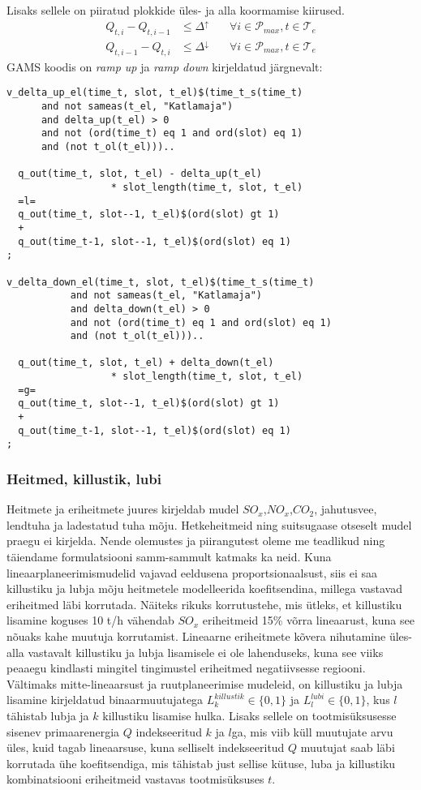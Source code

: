 \documentclass[10pt,a4paper]{article}
\begin{document}
Lisaks sellele on piiratud plokkide üles- ja alla koormamise kiirused.
\begin{align}
Q_{t,i} - Q_{t,i-1} &\leq \mathit{\Delta^{\uparrow}} \quad &\forall i \in \mathcal{P}_{max}, t \in \mathcal{T}_e\\
Q_{t,i-1} - Q_{t,i} &\leq \mathit{\Delta^{\downarrow}}\quad &\forall i \in \mathcal{P}_{max}, t \in \mathcal{T}_e
\end{align}
GAMS koodis on \emph{ramp up} ja \emph{ramp down} kirjeldatud järgnevalt:
\begin{verbatim}
v_delta_up_el(time_t, slot, t_el)$(time_t_s(time_t)
      and not sameas(t_el, "Katlamaja")
      and delta_up(t_el) > 0
      and not (ord(time_t) eq 1 and ord(slot) eq 1) 
      and (not t_ol(t_el)))..

  q_out(time_t, slot, t_el) - delta_up(t_el)
                  * slot_length(time_t, slot, t_el)
  =l=
  q_out(time_t, slot--1, t_el)$(ord(slot) gt 1)
  +
  q_out(time_t-1, slot--1, t_el)$(ord(slot) eq 1)
;

v_delta_down_el(time_t, slot, t_el)$(time_t_s(time_t)
           and not sameas(t_el, "Katlamaja")
           and delta_down(t_el) > 0
           and not (ord(time_t) eq 1 and ord(slot) eq 1) 
           and (not t_ol(t_el)))..

  q_out(time_t, slot, t_el) + delta_down(t_el)
                  * slot_length(time_t, slot, t_el)
  =g=
  q_out(time_t, slot--1, t_el)$(ord(slot) gt 1)
  +
  q_out(time_t-1, slot--1, t_el)$(ord(slot) eq 1)
;
\end{verbatim}

\subsubsection{Heitmed, killustik, lubi}
Heitmete ja eriheitmete juures kirjeldab mudel $SO_x$,$NO_x$,$CO_2$, jahutusvee, lendtuha ja ladestatud tuha mõju. Hetkeheitmeid ning suitsugaase otseselt mudel praegu ei kirjelda. Nende olemustes ja piirangutest oleme me teadlikud ning täiendame formulatsiooni samm-sammult katmaks ka neid. Kuna lineaarplaneerimismudelid vajavad eeldusena proportsionaalsust, siis ei saa killustiku ja lubja mõju heitmetele modelleerida koefitsendina, millega vastavad eriheitmed läbi korrutada. Näiteks rikuks korrutustehe, mis ütleks, et killustiku lisamine koguses 10 t/h vähendab $SO_x$ eriheitmeid 15\% võrra lineaarust, kuna see nõuaks kahe muutuja korrutamist. Lineaarne eriheitmete kõvera nihutamine üles-alla vastavalt killustiku ja lubja lisamisele ei ole lahenduseks, kuna see viiks peaaegu kindlasti mingitel tingimustel eriheitmed negatiivsesse regiooni. Vältimaks mitte-lineaarsust ja ruutplaneerimise mudeleid, on killustiku ja lubja lisamine kirjeldatud binaarmuutujatega $L^{killustik}_k \in \{0,1\}$ ja $L^{lubi}_l \in \{0,1\}$, kus $l$ tähistab lubja ja $k$ killustiku lisamise hulka. Lisaks sellele on tootmisüksusesse sisenev primaarenergia $Q$ indekseeritud $k$ ja $l$ga, mis viib küll muutujate arvu üles, kuid tagab lineaarsuse, kuna selliselt indekseeritud $Q$ muutujat saab läbi korrutada ühe koefitsendiga, mis tähistab just sellise kütuse, luba ja killustiku kombinatsiooni eriheitmeid vastavas tootmisüksuses $t$.
\end{document}
